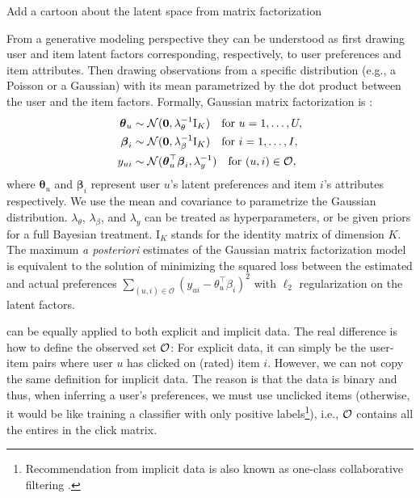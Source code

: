 \PP Add a cartoon about the latent space from matrix factorization

From a generative modeling perspective they
can be understood as first drawing user and item latent factors corresponding,
respectively, to user preferences and item attributes. Then drawing 
observations from a specific distribution (e.g., a Poisson
or a Gaussian) with its mean parametrized by the dot product between the user and
the item factors. Formally, Gaussian matrix factorization is \citep{mnih2007probabilistic}: 
\begin{equation} 
\begin{split}
	\boldsymbol\theta_{u} &\sim \mathcal{N}(\boldsymbol{0}, \lambda_\theta^{-1} \mathrm{I}_K) \quad \textrm{for } u = 1, \dots, U, \\
	\boldsymbol\beta_{i} &\sim \mathcal{N}(\boldsymbol{0}, \lambda_\beta^{-1} \mathrm{I}_K) \quad \textrm{for } i = 1, \dots, I, \\
	y_{ui} &\sim \mathcal{N}(\boldsymbol\theta_u^\top \boldsymbol\beta_i, \lambda_y^{-1}) \quad \textrm{for } (u, i) \in \mathcal{O}, 
 \end{split}
 \label{chpt:background:eq:gmf}
 \end{equation}
where $\boldsymbol\theta_u$ and $\boldsymbol\beta_i$ represent user $u$'s latent preferences and
item $i$'s attributes respectively. We use the mean and covariance to
parametrize the Gaussian distribution. $\lambda_\theta$, $\lambda_\beta$, and
$\lambda_y$ can be treated as hyperparameters, or be given priors for a full Bayesian treatment. $\mathrm{I}_K$ stands for the identity
matrix of dimension $K$. The maximum \emph{a posteriori} estimates of the Gaussian matrix factorization model is equivalent to the solution of minimizing the squared loss between the estimated and actual preferences $\sum_{(u, i)\in \mathcal{O}} (y_{ui} - \theta_u^\top\beta_i)^2$ with $\ell_2$ regularization on the latent factors.

  can be equally applied to both explicit and implicit data. The real difference is how to define the observed set $\mathcal{O}$: For explicit data, it can simply be the user-item pairs where user $u$ has clicked on (rated) item $i$. However, we can not copy the same definition for implicit data. The reason is that the data is binary and thus, when inferring a user's preferences, we must use unclicked items (otherwise, it would be like training a classifier with only positive labels\footnote{Recommendation from implicit data is also known as one-class collaborative filtering \citep{pan2008one}.}), i.e., $\mathcal{O}$ contains all the entires in the click matrix. 


